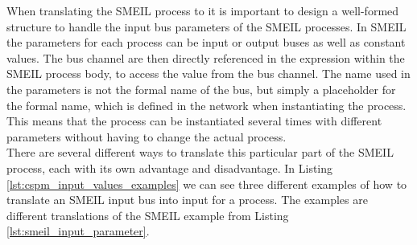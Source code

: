 When translating the SMEIL process to \cspm{} it is important to design a well-formed structure to handle the input bus parameters of the SMEIL processes.
In SMEIL the parameters for each process can be input or output buses as well as constant values. The bus channel are then directly referenced in the expression within the SMEIL process body, to access the value from the bus channel. The name used in the parameters is not the formal name of the bus, but simply a placeholder for the formal name, which is defined in the network when instantiating the process. This means that the process can be instantiated several times with different parameters without having to change the actual process. \\

There are several different ways to translate this particular part of the SMEIL process, each with its own advantage and disadvantage.
In Listing \ref{lst:cspm_input_values_examples} we can see three different examples of how to translate an SMEIL input bus into input for a \cspm{} process. The examples are different translations of the SMEIL example from Listing \ref{lst:smeil_input_parameter}.\\

